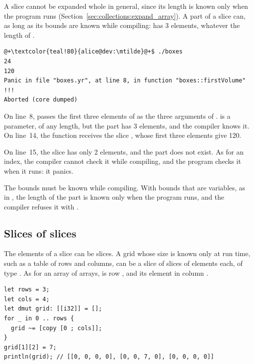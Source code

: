 A slice cannot be expanded whole in general, since its length is known only
when the program runs (Section~\ref{sec:collections:expand_array}). A part of a
slice can, as long as its bounds are known while compiling: 
has 3 elements, whatever the length of .


\vspace{-10pt}%
\begin{lstlisting}[style=bashVerb, escapechar=@+]
@+\textcolor{teal!80}{alice@dev:\mtilde}@+$ ./boxes
24
120
Panic in file "boxes.yr", at line 8, in function "boxes::firstVolume" !!!
Aborted (core dumped)
\end{lstlisting}

On line~8,  passes the first three elements of
 as the three arguments of .  is a
parameter, of any length, but the part has 3 elements, and the compiler knows
it. On line~14, the function receives the slice \token{[4, 5, 6]}, whose first
three elements give 120.

On line~15, the slice has only 2 elements, and the part 
does not exist. As for an index, the compiler cannot check it while compiling,
and the program checks it when it runs: it panics.

The bounds must be known while compiling. With bounds that are variables, as in
, the length of the part is known only when the
program runs, and the compiler refuses it with .

\subsection{Slices of slices}
\label{sec:collections:grids}

The elements of a slice can be slices. A grid whose size is known only at run
time, such as a table of  rows and  columns, can be a
slice of  slices of  elements each, of type
\token{[[i32]]}. As for an array of arrays,  is row ,
and  its element in column .

\begin{lstlisting}[style=coloredverbatim]
let rows = 3;
let cols = 4;
let dmut grid: [[i32]] = [];
for _ in 0 .. rows {
  grid ~= [copy [0 ; cols]];
}
grid[1][2] = 7;
println(grid); // [[0, 0, 0, 0], [0, 0, 7, 0], [0, 0, 0, 0]]
\end{lstlisting}

